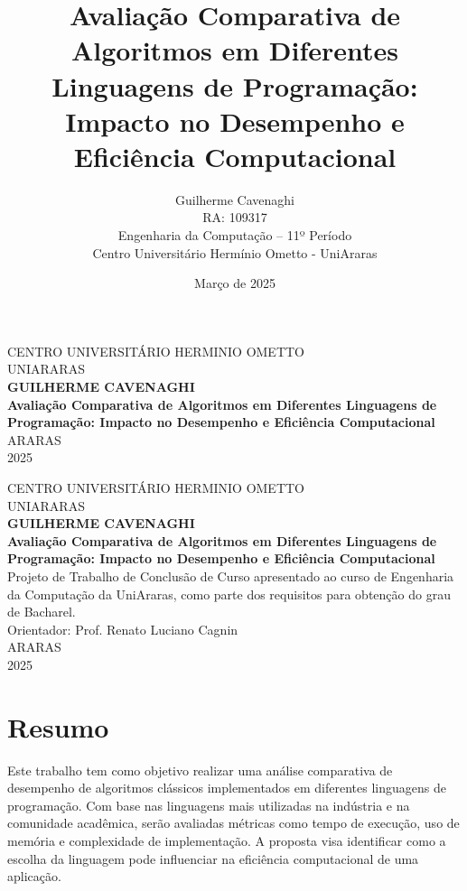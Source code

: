 \documentclass[12pt,oneside,a4paper]{report}
\title{\textbf{Avaliação Comparativa de Algoritmos em Diferentes Linguagens de Programação: Impacto no Desempenho e Eficiência Computacional}}
\author{Guilherme Cavenaghi \\ RA: 109317 \\ Engenharia da Computação -- 11º Período \\ Centro Universitário Hermínio Ometto - UniAraras}
\date{Março de 2025}
\begin{document}
\begin{titlepage}
    \begin{center}
        \large
        CENTRO UNIVERSITÁRIO HERMINIO OMETTO\\
        UNIARARAS\\[1.5cm]

        \textbf{GUILHERME CAVENAGHI}\\[5cm]

        \textbf{\Large Avaliação Comparativa de Algoritmos em Diferentes Linguagens de Programação: Impacto no Desempenho e Eficiência Computacional}\\[5cm]

        ARARAS\\
        2025
    \end{center}
\end{titlepage}

\begin{titlepage}
    \begin{center}
        \large
        CENTRO UNIVERSITÁRIO HERMINIO OMETTO\\
        UNIARARAS\\[1.5cm]

        \textbf{GUILHERME CAVENAGHI}\\[5cm]

        \textbf{\Large Avaliação Comparativa de Algoritmos em Diferentes Linguagens de Programação: Impacto no Desempenho e Eficiência Computacional}\\[1.5cm]

        Projeto de Trabalho de Conclusão de Curso apresentado ao curso de Engenharia da Computação da UniAraras, como parte dos requisitos para obtenção do grau de Bacharel.\\[0.5cm]

        Orientador: Prof. Renato Luciano Cagnin\\[3cm]

        ARARAS\\
        2025
    \end{center}
\end{titlepage}

\chapter*{Resumo}
Este trabalho tem como objetivo realizar uma análise comparativa de desempenho de algoritmos clássicos implementados em diferentes linguagens de programação. Com base nas linguagens mais utilizadas na indústria e na comunidade acadêmica, serão avaliadas métricas como tempo de execução, uso de memória e complexidade de implementação. A proposta visa identificar como a escolha da linguagem pode influenciar na eficiência computacional de uma aplicação.
\end{document}
